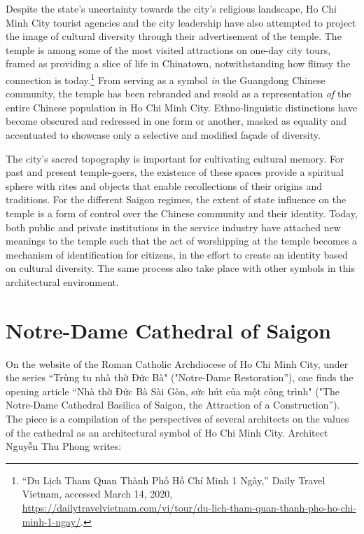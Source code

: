Despite the state's uncertainty towards the city's religious landscape, Ho Chi Minh City tourist agencies and the city leadership have also attempted to project the image of cultural diversity through their advertisement of the temple. The temple is among some of the most visited attractions on one-day city tours, framed as providing a slice of life in Chinatown, notwithstanding how flimsy the connection is today.\footnote{“Du Lịch Tham Quan Thành Phố Hồ Chí Minh 1 Ngày,” Daily Travel Vietnam, accessed March 14, 2020, \url{https://dailytravelvietnam.com/vi/tour/du-lich-tham-quan-thanh-pho-ho-chi-minh-1-ngay/}.} From serving as a symbol \textit{in} the Guangdong Chinese community, the temple has been rebranded and resold as a representation \textit{of} the entire Chinese population in Ho Chi Minh City. Ethno-linguistic distinctions have become obscured and redressed in one form or another,  masked as equality and accentuated to showcase only a selective and modified façade of diversity.

The city's sacred topography is important for cultivating cultural memory. For past and present temple-goers, the existence of these spaces provide a spiritual sphere with rites and objects that enable recollections of their origins and traditions. For the different Saigon regimes, the extent of state influence on the temple is a form of control over the Chinese community and their identity. Today, both public and private institutions in the service industry have attached new meanings to the temple such that the act of worshipping at the temple becomes a mechanism of identification for citizens, in the effort to create an identity based on cultural diversity. The same process also take place with other symbols in this architectural environment.

\section{Notre-Dame Cathedral of Saigon}

On the website of the Roman Catholic Archdiocese of Ho Chi Minh City, under the series “Trùng tu nhà thờ Đức Bà" ("Notre-Dame Restoration”), one finds the opening article “Nhà thờ Đức Bà Sài Gòn, sức hút của một công trình" ("The Notre-Dame Cathedral Basilica of Saigon, the Attraction of a Construction”). The piece is a compilation of the perspectives of several architects on the values of the cathedral as an architectural symbol of Ho Chi Minh City. Architect Nguyễn Thu Phong writes:

